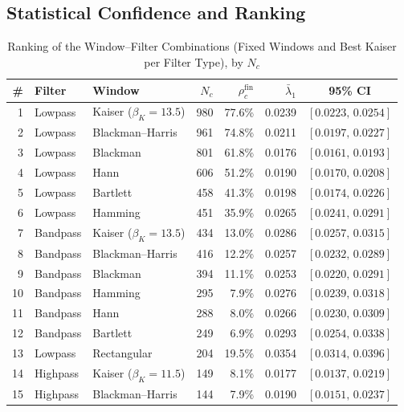 \documentclass[journal]{IEEEtran}
\begin{document}
\subsection{Statistical Confidence and Ranking}\label{sub:ranking}
\begin{table}[!t]
\caption{Ranking of the Window--Filter Combinations (Fixed Windows and Best Kaiser per Filter Type), by $N_c$\label{tab:ranking}}
\centering
\begin{tabular}{rllrrrc}
\toprule
\textbf{\#} & \textbf{Filter} & \textbf{Window} & $N_c$ &
$\rho_c^{\text{fin}}$ & $\bar\lambda_1$ & 95\% CI \\
\midrule
 1 & Lowpass   & Kaiser ($\beta_K{=}13.5$) & 980 & 77.6\% & 0.0239 & $[0.0223,\,0.0254]$ \\
 2 & Lowpass   & Blackman--Harris          & 961 & 74.8\% & 0.0211 & $[0.0197,\,0.0227]$ \\
 3 & Lowpass   & Blackman                  & 801 & 61.8\% & 0.0176 & $[0.0161,\,0.0193]$ \\
 4 & Lowpass   & Hann                      & 606 & 51.2\% & 0.0190 & $[0.0170,\,0.0208]$ \\
 5 & Lowpass   & Bartlett                  & 458 & 41.3\% & 0.0198 & $[0.0174,\,0.0226]$ \\
 6 & Lowpass   & Hamming                   & 451 & 35.9\% & 0.0265 & $[0.0241,\,0.0291]$ \\
 7 & Bandpass  & Kaiser ($\beta_K{=}13.5$) & 434 & 13.0\% & 0.0286 & $[0.0257,\,0.0315]$ \\
 8 & Bandpass  & Blackman--Harris          & 416 & 12.2\% & 0.0257 & $[0.0232,\,0.0289]$ \\
 9 & Bandpass  & Blackman                  & 394 & 11.1\% & 0.0253 & $[0.0220,\,0.0291]$ \\
10 & Bandpass  & Hamming                   & 295 & 7.9\% & 0.0276 & $[0.0239,\,0.0318]$ \\
11 & Bandpass  & Hann                      & 288 & 8.0\% & 0.0266 & $[0.0230,\,0.0309]$ \\
12 & Bandpass  & Bartlett                  & 249 & 6.9\% & 0.0293 & $[0.0254,\,0.0338]$ \\
13 & Lowpass   & Rectangular               & 204 & 19.5\% & 0.0354 & $[0.0314,\,0.0396]$ \\
14 & Highpass  & Kaiser ($\beta_K{=}11.5$) & 149 & 8.1\% & 0.0177 & $[0.0137,\,0.0219]$ \\
15 & Highpass  & Blackman--Harris          & 144 & 7.9\% & 0.0190 & $[0.0151,\,0.0237]$ \\

\end{tabular}
\end{table}
\end{document}
